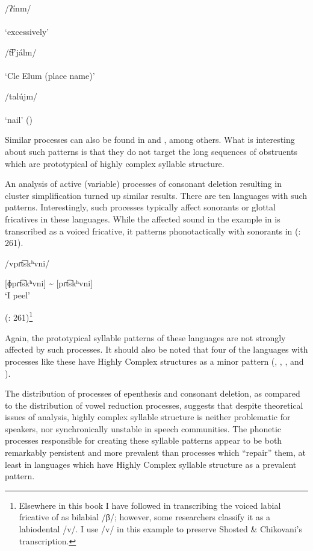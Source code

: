 \ea\label{ex:8.7}

\ea  /ʔínm/\\\relax
  [ʔínɨm]\\
  \glt ‘excessively’

\ex  /t͡ɬ’jálm/\\\relax
  [t͡ɬ’jálɨm]\\
  \glt ‘Cle Elum (place name)’

\ex  /talújm/\\\relax
  [talújɨm]\\
  \glt ‘nail’
\z
(\citealt[28]{HargusBeavert2006})
\z

Similar processes can also be found in  and , among others. What is interesting about such patterns is that they do not target the long sequences of obstruents which are prototypical of highly complex syllable structure.

  An analysis of active (variable) processes of consonant deletion resulting in cluster simplification turned up similar results. There are ten languages with such patterns. Interestingly, such processes typically affect sonorants or glottal fricatives in these languages. While the affected sound in the example in  is transcribed as a voiced fricative, it patterns phonotactically with sonorants in  (\citealt{ShostedChikovani2006}: 261).

\ea\label{ex:8.8}

/vpɾt͡skʰvni/

[ɸpɾt͡skʰvni] {\textasciitilde} [pɾt͡skʰvni]\\
\glt ‘I peel’

(\citealt{ShostedChikovani2006}: 261)\footnote{{Elsewhere in this book I have followed \citet{Aronson1991} in transcribing the voiced labial fricative of  as bilabial /β/; however, some researchers classify it as a labiodental /v/. I use /v/ in this example to preserve Shosted \& Chikovani’s transcription.}}
\z

Again, the prototypical syllable patterns of these languages are not strongly affected by such processes. It should also be noted that four of the languages with processes like these have Highly Complex structures as a minor pattern (, , , and ).

  The distribution of processes of epenthesis and consonant deletion, as compared to the distribution of vowel reduction processes, suggests that despite theoretical issues of analysis, highly complex syllable structure is neither problematic for speakers, nor synchronically unstable in speech communities. The phonetic processes responsible for creating these syllable patterns appear to be both remarkably persistent and more prevalent than processes which ``repair'' them, at least in languages which have Highly Complex syllable structure as a prevalent pattern.

